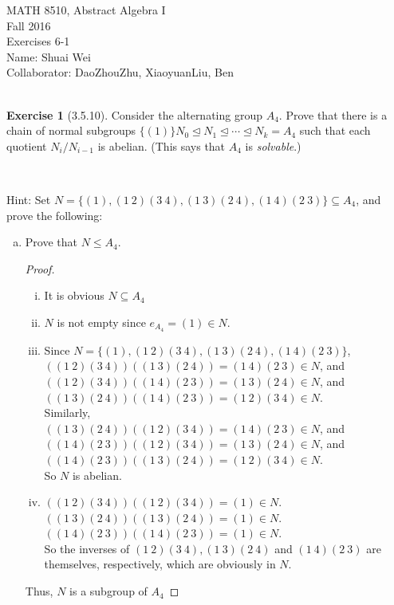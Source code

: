 \documentclass{amsart}
\theoremstyle{plain}
\theoremstyle{definition}
\newtheorem{exer}[lem]{Exercise}
\begin{document}
\noindent MATH 8510, Abstract Algebra I \\
Fall 2016\\
Exercises 6-1\\
Name: Shuai Wei\\
Collaborator: DaoZhouZhu, XiaoyuanLiu, Ben\\
\

%
%

\begin{exer}[3.5.10]
Consider the alternating group $A_4$.
Prove that there is a chain of normal subgroups $\{(1)\}N_0\unlhd N_1\unlhd\cdots\unlhd N_k=A_4$ such that each quotient $N_i/N_{i-1}$ is abelian.
(This says that $A_4$ is \emph{solvable}.)

\

\noindent
Hint: 
Set $N=\{(1),(1\ 2)(3\ 4),(1\ 3)(2\ 4),(1\ 4)(2\ 3)\}\subseteq A_4$, and prove the following:
\begin{enumerate}[(a)]
\item 
Prove that $N\leq A_4$. 

\begin{proof}
  \begin{enumerate}[(i)]
	  \item It is obvious $N \subseteq A_4$
	  \item $N$ is not empty since $e_{A_4} = (1) \in N$.
	  \item Since $N=\{(1), (1~ 2)(3~ 4),(1~ 3)(2~ 4),(1~ 4)(2~ 3)\}$, \\
	  	$\left((1~ 2)(3~ 4)\right)\left((1~ 3)(2~ 4)\right) = (1~ 4)(2~ 3) \in N$, and \\
	  	$\left((1~ 2)(3~ 4)\right)\left((1~ 4)(2~ 3)\right) = (1~ 3)(2~ 4)\in N$, and\\
	  	$\left((1~ 3)(2~ 4)\right)\left((1~ 4)(2~ 3)\right) = (1~ 2)(3~ 4)\in N$.\\
		Similarly, \\
	  	$\left((1~ 3)(2~ 4)\right)\left((1~ 2)(3~ 4)\right) = (1~ 4)(2~ 3) \in N$, and \\
	  	$\left((1~ 4)(2~ 3)\right)\left((1~ 2)(3~ 4)\right) = (1~ 3)(2~ 4)\in N$, and\\
	  	$\left((1~ 4)(2~ 3)\right)\left((1~ 3)(2~ 4)\right) = (1~ 2)(3~ 4)\in N$.\\
	  	So $N$ is abelian.
	  \item $\left((1~ 2)(3~ 4)\right)\left((1~ 2)(3~ 4)\right) = (1) \in N$.\\
			$\left((1~ 3)(2~ 4)\right)\left((1~ 3)(2~ 4)\right) = (1) \in N$.\\
				$\left((1~ 4)(2~ 3)\right)\left((1~ 4)(2~ 3)\right) = (1) \in N$.\\
		So the inverses of $(1~ 2)(3~ 4),(1~ 3)(2~ 4)$ and $(1~ 4)(2~ 3)$ are themselves, respectively, which are obviously in $N$.
	\end{enumerate}
	Thus, $N$ is a subgroup of $A_4$
\end{proof}


\end{enumerate}
\end{exer}
\end{document}
